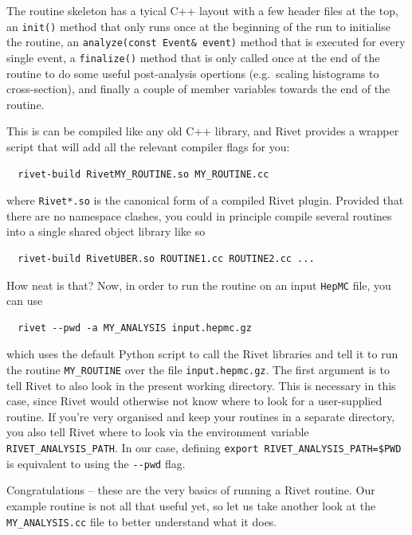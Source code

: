 \documentclass[10pt,fleqn]{scrartcl}
\theoremstyle{exstyle}
\begin{document}
The routine skeleton has a tyical C++ layout with a few header files at the top,
an \verb|init()| method that only runs once at the beginning of the run %
to initialise the routine, an \verb|analyze(const Event& event)| method that is executed for every
single event, a \verb|finalize()| method that is only called once at the end of the routine
to do some useful post-analysis opertions (e.g.\ scaling histograms to cross-section),
and finally a couple of member variables towards the end of the routine.

This is can be compiled like any old C++ library, and Rivet provides a wrapper script
that will add all the relevant compiler flags for you: 
\begin{verbatim}
  rivet-build RivetMY_ROUTINE.so MY_ROUTINE.cc
\end{verbatim}
where \verb|Rivet*.so| is the canonical form of a compiled Rivet plugin. 
Provided that there are no namespace clashes, you could in principle 
compile several routines into a single shared object library like so
\begin{verbatim}
  rivet-build RivetUBER.so ROUTINE1.cc ROUTINE2.cc ...
\end{verbatim}
How neat is that? Now, in order to run the routine on an input \texttt{HepMC} file, 
you can use
\begin{verbatim}
  rivet --pwd -a MY_ANALYSIS input.hepmc.gz
\end{verbatim}
which uses the default Python script to call the Rivet libraries and tell it to run 
the routine \verb|MY_ROUTINE| over the file \verb|input.hepmc.gz|. The first argument
is to tell Rivet to also look in the present working directory.
This is necessary in this case, since Rivet would otherwise not know where to look
for a user-supplied routine. If you're very organised and keep your routines 
in a separate directory, you also tell Rivet where to look via the environment
variable \verb|RIVET_ANALYSIS_PATH|. In our case, defining 
\verb|export RIVET_ANALYSIS_PATH=$PWD| is equivalent to using the \verb|--pwd| flag.

Congratulations -- these are the very basics of running a Rivet routine. 
Our example routine is not all that useful yet, so let us take another
look at the \verb|MY_ANALYSIS.cc| file to better understand what it does.
\end{document}

